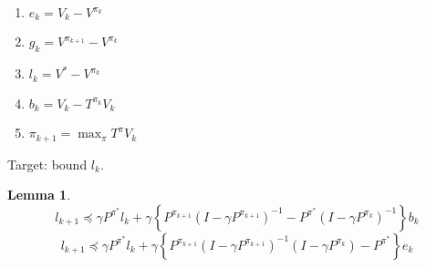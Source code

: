 \documentclass[a4paper]{article}
\newtheorem{lemma}{Lemma}
\begin{document}
\begin{enumerate}
    \item $ e_k = V_k - V^{\pi_k} $
    \item $ g_k = V^{\pi_{k+1}} - V^{\pi_k} $
    \item $ l_k = V^* - V^{\pi_k} $
    \item $ b_k = V_k - T^{\pi_k} V_k $
        \item $ \pi_{k+1} = \max_{\pi} T^{\pi} V_k $
\end{enumerate}
Target: bound $ l_k $.
\begin{lemma}
    \[
        l_{k+1} \preceq \gamma P^{\pi^*}l_k + \gamma \left\{  P^{\pi_{k+1}}{( I - \gamma P^{\pi_{k+1}})}^{-1}  - P^{\pi^*} {(I - \gamma P^{\pi_k})}^{-1}\right\} b_k
    \]
    \[
        l_{k+1} \preceq \gamma P^{\pi^*} l_k + \gamma \left\{ P^{\pi_{k+1}}{( I - \gamma P^{\pi_{k+1}})}^{-1} (I - \gamma P^{\pi_k}) - P^{\pi^*} \right\} e_k
    \]
    

\end{lemma}
\end{document}
